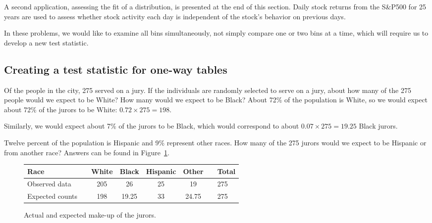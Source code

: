 A second application, assessing the fit of a distribution, is presented at the end of this section. Daily stock returns from the S\&P500 for 25 years are used to assess whether stock activity each day is independent of the stock's behavior on previous days.

In these problems, we would like to examine all bins simultaneously, not simply compare one or two bins at a time, which will require us to develop a new test statistic.


\subsection{Creating a test statistic for one-way tables}

\begin{examplewrap}
\begin{nexample}{Of the people in the city, 275 served on a jury. If the individuals are randomly selected to serve on a jury, about how many of the 275 people would we expect to be White? How many would we expect to be Black?}
About 72\% of the population is White, so we would expect about 72\% of the jurors to be White: $0.72\times 275 = 198$.

Similarly, we would expect about 7\% of the jurors to be Black, which would correspond to about $0.07\times 275 = 19.25$ Black jurors.
\end{nexample}
\end{examplewrap}

\begin{exercisewrap}
\begin{nexercise}
Twelve percent of the population is Hispanic and 9\% represent other races. How many of the 275 jurors would we expect to be Hispanic or from another race? Answers can be found in Figure~\ref{expectedJuryRepresentationIfNoBias}.
\end{nexercise}
\end{exercisewrap}

\begin{figure}[h]
\centering
\begin{tabular}{ll ccc c ll}
\hline
Race	 & \hspace{2mm} & White & Black & Hispanic & Other & \hspace{2mm} & Total \\
\hline
Observed data			&	& 205 & 26	& 25 & 19	&	& 275 \\
Expected counts	 &	& 198 & 19.25 & 33 & 24.75 & & 275 \\
\hline
\end{tabular}
\caption{Actual and expected make-up of the jurors.}
\label{expectedJuryRepresentationIfNoBias}
\end{figure}

